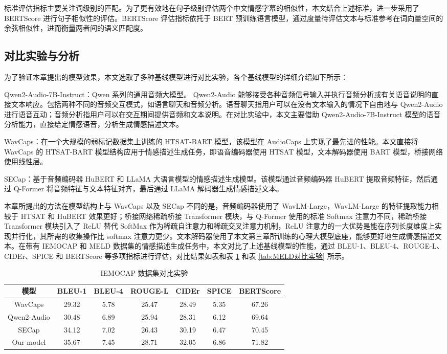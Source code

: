 标准评估指标主要关注词级别的匹配。为了更有效地在句子级别评估两个中文情感字幕的相似性，本文结合上述标准，进一步采用了 BERTScore 进行句子相似性的评估。BERTScore 评估指标依托于 BERT 预训练语言模型，通过度量待评估文本与标准参考在词向量空间的余弦相似性，进而衡量两者间的语义匹配度。

\subsection{对比实验与分析}

为了验证本章提出的模型效果，本文选取了多种基线模型进行对比实验，各个基线模型的详细介绍如下所示：

Qwen2-Audio-7B-Instruct：Qwen 系列的通用音频大模型。 Qwen2-Audio 能够接受各种音频信号输入并执行音频分析或有关语音说明的直接文本响应。包括两种不同的音频交互模式，如语言聊天和音频分析。语音聊天指用户可以在没有文本输入的情况下自由地与 Qwen2-Audio 进行语音互动；音频分析指用户可以在交互期间提供音频和文本说明。在对比实验中，本文主要借助 Qwen2-Audio-7B-Instruct 模型的语音分析能力，直接给定情感语音，分析生成情感描述文本。

WavCaps：在一个大规模的弱标记数据集上训练的 HTSAT-BART 模型，该模型在 AudioCaps 上实现了最先进的性能。本文直接将 WavCaps 的 HTSAT-BART 模型结构应用于情感描述生成任务，即语音编码器使用 HTSAT 模型，文本解码器使用 BART 模型，桥接网络使用线性层。

SECap：基于音频编码器 HuBERT 和 LLaMA 大语言模型的情感描述生成模型。该模型通过音频编码器 HuBERT 提取音频特征，然后通过 Q-Former 将音频特征与文本特征对齐，最后通过 LLaMA 解码器生成情感描述文本。

本章所提出的方法在模型结构上与 WavCaps 以及 SECap 不同的是，音频编码器使用了 WavLM-Large，WavLM-Large 的特征提取能力相较于 HTSAT 和 HuBERT 效果更好；桥接网络稀疏桥接 Transformer 模块，与 Q-Former 使用的标准 Softmax 注意力不同，稀疏桥接 Transformer 模块引入了 ReLU 替代 SoftMax 作为稀疏自注意力和稀疏交叉注意力机制，ReLU 注意力的一大优势是能在序列长度维度上实现并行化，其所需的收集操作比 softmax 注意力更少。文本解码器使用了本文第三章所训练的心理大模型底座，能够更好地生成情感描述文本。在带有 IEMOCAP 和 MELD 数据集的情感描述生成任务中，本文对比了上述基线模型的性能，通过 BLEU-1、BLEU-4、ROUGE-L、CIDEr、SPICE 和 BERTScore 等多项指标进行评估，对比结果如表和表 \ref{tab:IEMOCAP对比实验} 和表 \ref{tab:MELD对比实验} 所示。

\begin{table}
  \centering
  \caption{IEMOCAP 数据集对比实验}
  \label{tab:IEMOCAP对比实验}
  \begin{tabular}{ccccccc}
    \toprule
    模型 & BLEU-1 & BLEU-4 & ROUGE-L & CIDEr & SPICE & BERTScore \\
    \midrule
    WavCaps & 29.32 & 5.78 & 25.47 & 28.49 & 5.35 & 67.26 \\
    Qwen2-Audio & 30.48 & 6.89 & 25.94 & 28.31 & 6.12 & 69.64 \\
    SECap & 34.12 & 7.02 & 26.43 & 30.19 & 6.47 & 70.45 \\
    Our model & 35.67 & 7.45 & 28.71 & 32.05 & 6.86 & 71.82 \\
    \bottomrule
  \end{tabular}
\end{table}

